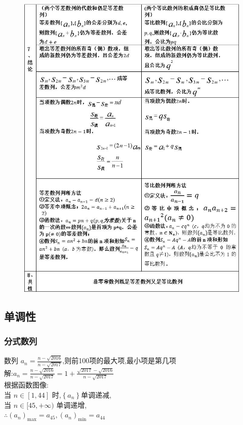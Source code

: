 \documentclass[hyperref, UTF8,11pt,a4paper]{ctexart} %
\begin{document}
\begin{figure}[!h] %
	\centering
	\includegraphics[width=450pt]  {pic/shulie/shuliexingzhi2.jpg} \\
\end{figure}

\clearpage
\subsection{单调性}
\subsubsection{分式数列}
{\color{red} 数列 $a_{n}=\frac{n-\sqrt{2016}}{n-\sqrt{2017}}$,则前100项的最大项,最小项是第几项 }\\
解:$a_{n}=\frac{n-\sqrt{2016}}{n-\sqrt{2017}}=1+\frac{\sqrt{2017}-\sqrt{2016}}{n-\sqrt{2017}}$ \\
根据函数图像: \\
当 $n \in[1,44]$ 时,$\left\{a_{n}\right\}$单调递减, \\
当 $n \in[45,+\infty)$ 单调递增, \\
$\therefore \left(a_{n}\right)_{\max }=a_{45},\left(a_{n}\right)_{\min }=a_{44}$
\end{document}
